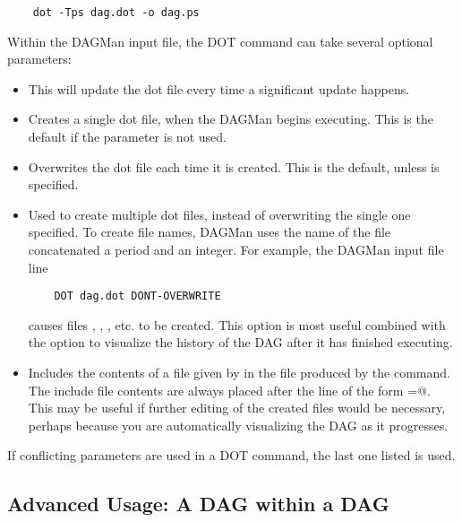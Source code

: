 \begin{verbatim}
    dot -Tps dag.dot -o dag.ps
\end{verbatim}

Within the DAGMan input file,
the DOT command can take several optional parameters:

\begin{itemize}

\item {}  This will update the dot file every time a
significant update happens. 

\item {} Creates a single dot file, when
the DAGMan begins executing. This is the default if the parameter
 is not used.

\item {} Overwrites the dot file each time it
is created. This is the default, unless 
is specified.

\item {} Used to create multiple dot files, instead
of overwriting the single one specified.
To create file names,
DAGMan uses the name of the file concatenated a period and an
integer. For example, the DAGMan input file line
\begin{verbatim}
    DOT dag.dot DONT-OVERWRITE
\end{verbatim}
causes files
,
,
,
etc. to be created.
This option is
most useful combined with the  option to
visualize the history of the DAG after it has finished executing. 

\item {} Includes the contents
of a file given by  in the file produced by the
 command.
The include file contents are always placed after the line of
the form
\verb@label=@.
This may be useful if further editing of the created files would
be necessary,
perhaps because you are automatically visualizing the DAG as it
progresses. 

\end{itemize}

If conflicting parameters are used in a DOT command, the last one
listed is used.
\subsection{\label{sec:DAGsinDAGs}Advanced Usage: A DAG within a DAG}

